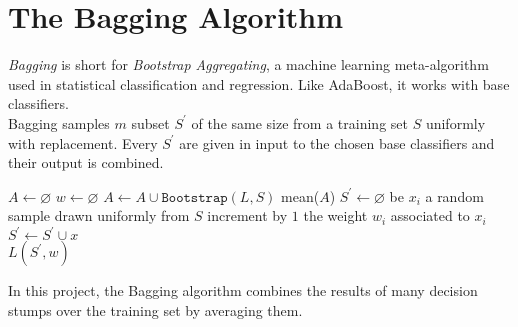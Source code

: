 
\chapter{The Bagging Algorithm}

\textit{Bagging} is short for \textit{Bootstrap Aggregating}, a machine learning meta-algorithm used in statistical classification and regression. Like AdaBoost, it works with base classifiers.\\
Bagging samples $m$ subset $S^{\prime}$ of the same size from a training set $S$ uniformly with replacement. Every $S^{\prime}$ are given in input to the chosen base classifiers and their output is combined.
\begin{algorithm}[htpb]
	\caption{}
	\label{alg:bagging}
	\begin{algorithmic}[1]
		\State $A \gets \varnothing$
		\State $w \gets \varnothing$
		\State $A \gets A \cup \texttt{Bootstrap}(L,S)$
		\EndFor
		\Return mean($A$)
		\EndProcedure
		\State $S^{\prime} \gets \varnothing$
		\State be $x_{i}$ a random sample drawn uniformly from $S$
		\State increment by $1$ the weight $w_{i}$ associated to $x_{i}$
		\State $S^{\prime} \gets S^{\prime} \cup x$
		\EndFor
		\\
		\Return $L(S^{\prime}, w)$
		\EndProcedure
	\end{algorithmic}
\end{algorithm}
In this project, the Bagging algorithm combines the results of many decision stumps over the training set by averaging them.
